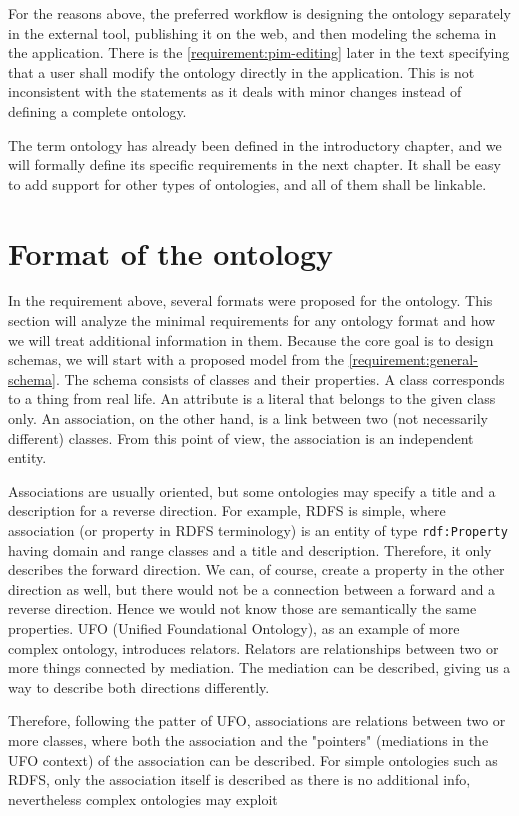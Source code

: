 For the reasons above, the preferred workflow is designing the ontology separately in the external tool, publishing it on the web, and then modeling the schema in the application. There is the \autoref{requirement:pim-editing} later in the text specifying that a user shall modify the ontology directly in the application. This is not inconsistent with the statements as it deals with minor changes instead of defining a complete ontology.

The term ontology has already been defined in the introductory chapter, and we will formally define its specific requirements in the next chapter. It shall be easy to add support for other types of ontologies, and all of them shall be linkable.

\section*{Format of the ontology}

In the requirement above, several formats were proposed for the ontology. This section will analyze the minimal requirements for any ontology format and how we will treat additional information in them. Because the core goal is to design schemas, we will start with a proposed model from the \autoref{requirement:general-schema}. The schema consists of classes and their properties. A class corresponds to a thing from real life. An attribute is a literal that belongs to the given class only. An association, on the other hand, is a link between two (not necessarily different) classes. From this point of view, the association is an independent entity.

Associations are usually oriented, but some ontologies may specify a title and a description for a reverse direction. For example, RDFS is simple, where association (or property in RDFS terminology) is an entity of type {\tt rdf:Property} having domain and range classes and a title and description. Therefore, it only describes the forward direction. We can, of course, create a property in the other direction as well, but there would not be a connection between a forward and a reverse direction. Hence we would not know those are semantically the same properties. UFO (Unified Foundational Ontology), as an example of more complex ontology, introduces relators. Relators are relationships between two or more things connected by mediation. The mediation can be described, giving us a way to describe both directions differently.

Therefore, following the patter of UFO, associations are relations between two or more classes, where both the association and the "pointers" (mediations in the UFO context) of the association can be described. For simple ontologies such as RDFS, only the association itself is described as there is no additional info, nevertheless complex ontologies may exploit

